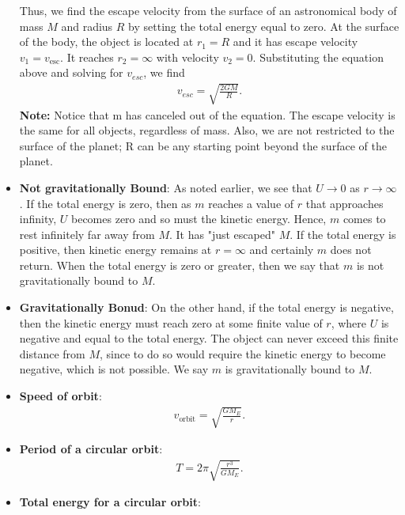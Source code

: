\documentclass{report}
\begin{document}
\begin{itemize}
            \bigbreak \noindent 
            Thus, we find the escape velocity from the surface of an astronomical body of mass \(M\) and radius \(R\) by setting the total energy equal to zero. At the surface of the body, the object is located at \(r_1 = R\) and it has escape velocity \(v_1 = v_{\text{esc}}\). It reaches \(r_2 = \infty\) with velocity \(v_2 = 0\). Substituting the equation above and solving for $v_{esc}$, we find
            \begin{align*}
                v_{esc} = \sqrt{\frac{2GM}{R}}
            .\end{align*}
            \bigbreak \noindent 
            \textbf{Note:} Notice that m has canceled out of the equation. The escape velocity is the same for all objects, regardless of mass. Also, we are not restricted to the surface of the planet; R can be any starting point beyond the surface of the planet.
        \item \textbf{Not gravitationally Bound}: 
            As noted earlier, we see that \(U \rightarrow 0\) as \(r \rightarrow \infty\). If the total energy is zero, then as \(m\) reaches a value of \(r\) that approaches infinity, \(U\) becomes zero and so must the kinetic energy. Hence, \(m\) comes to rest infinitely far away from \(M\). It has "just escaped" \(M\). If the total energy is positive, then kinetic energy remains at \(r = \infty\) and certainly \(m\) does not return. When the total energy is zero or greater, then we say that \(m\) is not gravitationally bound to \(M\).
        \item \textbf{Gravitationally Bonud}:
            On the other hand, if the total energy is negative, then the kinetic energy must reach zero at some finite value of \(r\), where \(U\) is negative and equal to the total energy. The object can never exceed this finite distance from \(M\), since to do so would require the kinetic energy to become negative, which is not possible. We say \(m\) is gravitationally bound to \(M\).
        \item \textbf{Speed of orbit}:
            \begin{align*}
                v_{\text{orbit}} = \sqrt{\frac{GM_{E}}{r}}
            .\end{align*}
        \item \textbf{Period of a circular orbit}:
            \begin{align*}
                T = 2\pi \sqrt{\frac{r^{3}}{GM_{E}}}
            .\end{align*}
        \item \textbf{Total energy for a circular orbit}:

\end{itemize}
\end{document}
